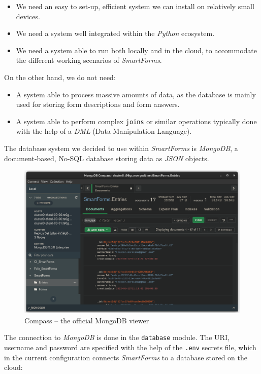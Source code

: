 \documentclass[12pt, a4paper]{report}
\def\code#1{\texttt{#1}}
\begin{document}
\begin{itemize}
    \item We need an easy to set-up, efficient system we can install on relatively small devices.
    \item We need a system well integrated within the \textit{Python} ecosystem.
    \item We need a system able to run both locally and in the cloud, to accommodate the different working scenarios of \textit{SmartForms}.
\end{itemize}

On the other hand, we do not need:
\begin{itemize}
    \item A system able to process massive amounts of data, as the database is mainly used for storing form descriptions and form answers.
    \item A system able to perform complex \code{joins} or similar operations typically done with the help of a \textit{DML} (Data Manipulation Language). 
\end{itemize}

The database system we decided to use within \textit{SmartForms} is \textit{MongoDB}, a document-based, No-SQL database storing data as \textit{JSON} objects.


\begin{figure}[!h]
    \centering
    \includegraphics[width=35em]{images/screenshoots/mongo-compas.png}
    \caption{Compass -- the official MongoDB viewer}
    \label{fig:label}
\end{figure}

The connection to \textit{MongoDB} is done in the \code{database} module. The URI, username and password are specified with the help of the \code{.env} secrets file, which in the current configuration connects \textit{SmartForms} to a database stored on the cloud:
\end{document}
